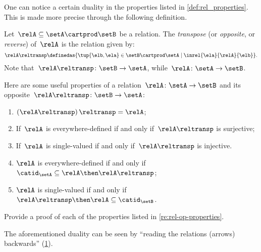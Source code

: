 One can notice a certain duality in the properties listed in \cref{def:rel_properties}.
This is made more precise through the following definition.


\begin{definition}
    \label{def:relation-transpose}
    Let~$\relA\subseteq \setA\cartprod \setB$ be a relation.
    The \emph{transpose} (or \emph{opposite}, or \emph{reverse}) of~$\relA$ is the relation given by:
    \begin{equation*}
        \relA\reltransp \definedas \{\tup{\elb,\ela}\in \setB\cartprod \setA \mid \inrel{\ela}{\relA}{\elb}\}.
    \end{equation*}
    Note that~$\relA\reltransp\colon \setB\to \setA$, while~$\relA\colon \setA\to \setB$.
\end{definition}
\begin{remark}
    \label{re:rel-op-properties}
    Here are some useful properties of a relation~$\relA\colon \setA\to \setB$  and its opposite~$\relA\reltransp\colon \setB\to \setA$:
    \begin{enumerate}
        \item $\left(\relA\reltransp\right)\reltransp = \relA $;
        \item If~$\relA$ is everywhere-defined if and only if~$\relA\reltransp$ is surjective;
        \item If~$\relA$ is single-valued if and only if~$\relA\reltransp$ is injective.
        \item $\relA$ is everywhere-defined if and only if~$\catid_\setA\subseteq \relA \then \relA\reltransp$;
        \item $\relA$ is single-valued if and only if~$\relA\reltransp\then \relA\subseteq \catid_\setB$.
    \end{enumerate}
\end{remark}

\begin{gradedexercise}
    \label{ex:RelProperties}
    Provide a proof of each of the properties listed in \cref{re:rel-op-properties}.
\end{gradedexercise}

\begin{remark}
    The aforementioned duality can be seen by ``reading the relations (arrows) backwards'' (\cref{fig:rel_transpose}).
\end{remark}

\begin{figure}[h!]
    \centering
    \caption{}
    \label{fig:rel_transpose}
\end{figure}
